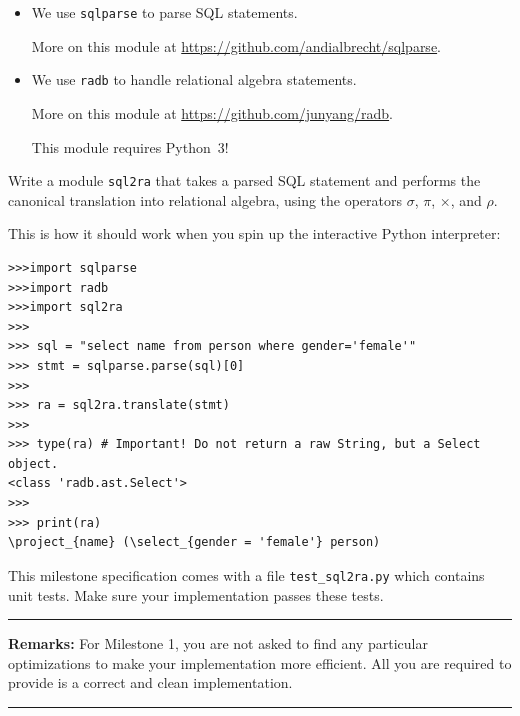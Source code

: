 \documentclass[12pt]{exam}
\begin{document}
\begin{itemize}
    \item 
We use \verb!sqlparse! to parse SQL statements.

More on this module at 
\url{https://github.com/andialbrecht/sqlparse}. 

\item
We use \verb!radb! to handle relational algebra statements. 

More on this module at
\url{https://github.com/junyang/radb}. 

This module requires Python~3!

\end{itemize}

\noindent
Write a module \verb!sql2ra! that takes a parsed SQL statement and performs the canonical translation into relational algebra, using the operators $\sigma$, $\pi$, $\times$, and $\rho$.

\newpage
\noindent
This is how it should work when you spin up the interactive Python interpreter:

\begin{Verbatim}[frame=single]
>>>import sqlparse
>>>import radb
>>>import sql2ra
>>>
>>> sql = "select name from person where gender='female'"
>>> stmt = sqlparse.parse(sql)[0]
>>>
>>> ra = sql2ra.translate(stmt)
>>>
>>> type(ra) # Important! Do not return a raw String, but a Select object.
<class 'radb.ast.Select'>
>>>
>>> print(ra)
\project_{name} (\select_{gender = 'female'} person)
\end{Verbatim}

\noindent
This milestone specification comes with a file \verb!test_sql2ra.py! which contains unit tests. Make sure your implementation passes these tests.


\bigskip
\noindent
\rule{\linewidth}{0.5mm}


{\bf Remarks:}
For Milestone 1, you are not asked to find any particular optimizations to make your implementation more efficient. All you are required to provide is a correct and clean implementation.

\noindent
\rule{\linewidth}{0.5mm}
\end{document}
